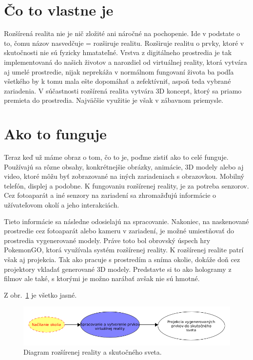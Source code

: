 \documentclass[10pt,twoside,a4paper]{article}
\begin{document}
\section{Čo to vlastne je} \label{co}

Rozšírená realita nie je nič zložité ani náročné na pochopenie. Ide v podstate o to, čomu názov nasvedčuje = rozširuje realitu. Rozširuje realitu o prvky, ktoré v skutočnosti nie sú fyzicky hmatateľné. Vrstva z digitálneho prostredia je tak implementovaná do našich životov a narozdiel od virtuálnej reality, ktorá vytvára aj umelé prostredie, nijak neprekáža v normálnom fungovaní života ba podľa všetkého by k tomu mala ešte dopomáhať a zefektívniť, aspoň teda vybrané zariadenia. V súčastnosti rozšírená realita vytvára  3D koncept, ktorý sa priamo premieta do prostredia. Najväčšie využitie je však v zábavnom priemysle.

\section{Ako to funguje}\label{ako}

Teraz keď už máme obraz o tom, čo to je, poďme zistiť ako to celé funguje. Používajú sa rôzne obsahy, konkrétnejšie obrázky, animácie, 3D modely alebo aj video, ktoré môžu byť zobrazované na iných zariadeniach  s obrazovkou. Mobilný telefón, displej a podobne. K fungovaniu rozšírenej reality, je za potreba senzorov. Cez fotoaparát a iné senzory na zariadení sa zhromažďujú informácie o užívateľovom okolí a jeho interakciách. \par Tieto informácie sa následne odosielajú na spracovanie. Nakoniec, na naskenované prostredie cez fotoaparát alebo kameru v zariadení, je možné umiestňovať do prostredia vygenerované modely. Práve toto bol obrovský úspech hry PokemonGO, ktorá využívala systém rozšírenej reality. K rozšírenej realite patrí však aj projekcia. Tak ako pracuje s prostredím a sníma okolie, dokáže doň cez projektory vkladať generované 3D modely. Predstavte si to ako hologramy z filmov ale také, s ktorými je možno narábať avšak nie sú hmotné.

Z obr.~\ref{f:rozhod} je všetko jasné. 

\begin{figure}[tbh]
\centering
\includegraphics[scale=0.5]{Diagram fungovania AR.png}
\caption{Diagram rozšírenej reality a skutočného sveta.}
\label{f:rozhod}
\end{figure}
\end{document}
